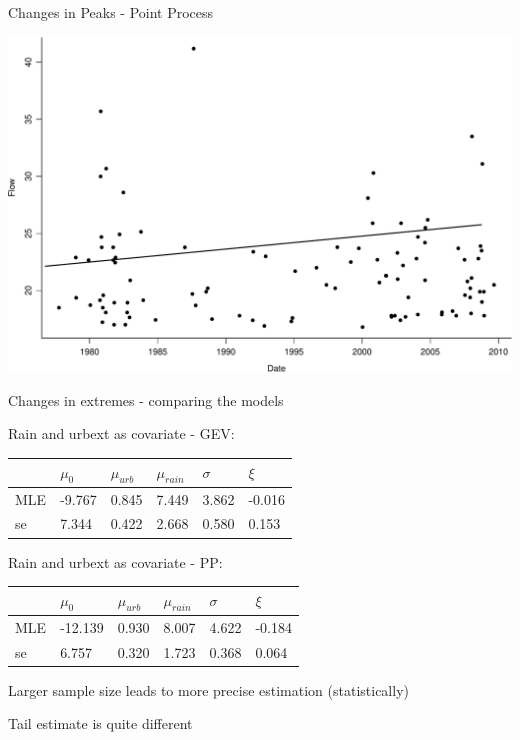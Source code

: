 \documentclass[
  10pt,
  ignorenonframetext,
  compress]{beamer}
\begin{document}
\begin{frame}{Changes in Peaks - Point Process}
\protect\hypertarget{changes-in-peaks---point-process}{}

\includegraphics{ProsdocimiPerugia_files/figure-beamer/ppFirstPlot-1.pdf}

\end{frame}

\begin{frame}{Changes in extremes - comparing the models}
\protect\hypertarget{changes-in-extremes---comparing-the-models}{}

Rain and urbext as covariate - GEV:

\begin{longtable}[]{@{}llllll@{}}
\toprule
& \(\mu_0\) & \(\mu_{urb}\) & \(\mu_{rain}\) & \(\sigma\) &
\(\xi\)\tabularnewline
\midrule
\endhead
MLE & -9.767 & 0.845 & 7.449 & 3.862 & -0.016\tabularnewline
se & 7.344 & 0.422 & 2.668 & 0.580 & 0.153\tabularnewline
\bottomrule
\end{longtable}

Rain and urbext as covariate - PP:

\begin{longtable}[]{@{}llllll@{}}
\toprule
& \(\mu_0\) & \(\mu_{urb}\) & \(\mu_{rain}\) & \(\sigma\) &
\(\xi\)\tabularnewline
\midrule
\endhead
MLE & -12.139 & 0.930 & 8.007 & 4.622 & -0.184\tabularnewline
se & 6.757 & 0.320 & 1.723 & 0.368 & 0.064\tabularnewline
\bottomrule
\end{longtable}

\pause

Larger sample size leads to more precise estimation (statistically)

Tail estimate is quite different

\end{frame}
\end{document}
